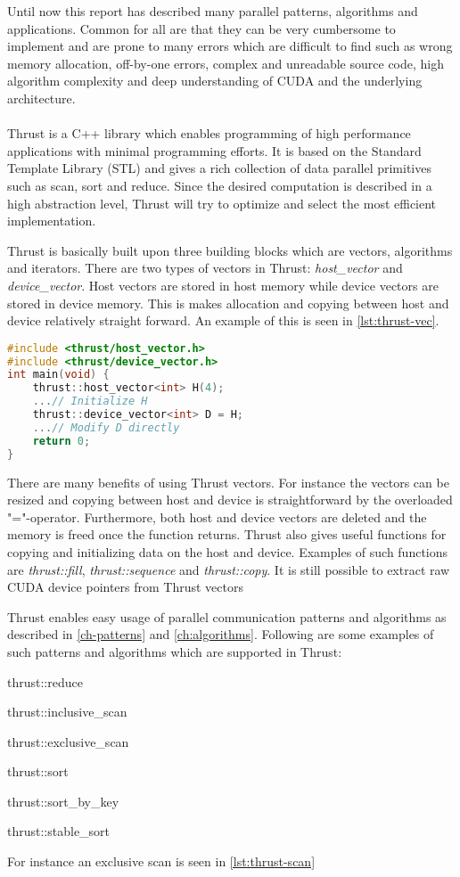 Until now this report has described many parallel patterns, algorithms and applications.
Common for all are that they can be very cumbersome to implement and are prone to many  errors which are difficult to find such as wrong memory allocation, off-by-one errors, complex and unreadable source code, high algorithm complexity and deep understanding of CUDA and the underlying architecture.
\\\\
Thrust is a C++ library which enables programming of high performance applications with minimal programming efforts.
It is based on the Standard Template Library (STL) and gives a rich collection of data parallel primitives such as scan, sort and reduce.
Since the desired computation is described in a high abstraction level, Thrust will try to optimize and select the most efficient implementation.

Thrust is basically built upon three building blocks which are vectors, algorithms and iterators.
There are two types of vectors in Thrust: \textit{host\_vector} and \textit{device\_vector}.
Host vectors are stored in host memory while device vectors are stored in device memory.
This is makes allocation and copying between host and device relatively straight forward.
An example of this is seen in \autoref{lst:thrust-vec}.
\begin{lstlisting}[language=C,caption={Vectors in Thrust},label=lst:thrust-vec]
#include <thrust/host_vector.h> 
#include <thrust/device_vector.h> 
int main(void) { 
	thrust::host_vector<int> H(4); 
	...// Initialize H
	thrust::device_vector<int> D = H; 
	...// Modify D directly
	return 0;
}
\end{lstlisting}
There are many benefits of using Thrust vectors.
For instance the vectors can be resized and copying between host and device is straightforward by the overloaded "="-operator.
Furthermore, both host and device vectors are deleted and the memory is freed once the function returns.
Thrust also gives useful functions for copying and initializing data on the host and device.
Examples of such functions are \textit{thrust::fill}, \textit{thrust::sequence} and \textit{thrust::copy}.
It is still possible to extract raw CUDA device pointers from Thrust vectors

Thrust enables easy usage of parallel communication patterns and algorithms as described in \autoref{ch-patterns} and \autoref{ch:algorithms}.
Following are some examples of such patterns and algorithms which are supported in Thrust:
\begin{itemizeSmall}
	\item thrust::reduce
	\item thrust::inclusive\_scan
	\item thrust::exclusive\_scan
	\item thrust::sort
	\item thrust::sort\_by\_key
	\item thrust::stable\_sort
\end{itemizeSmall}
For instance an exclusive scan is seen in \autoref{lst:thrust-scan}

